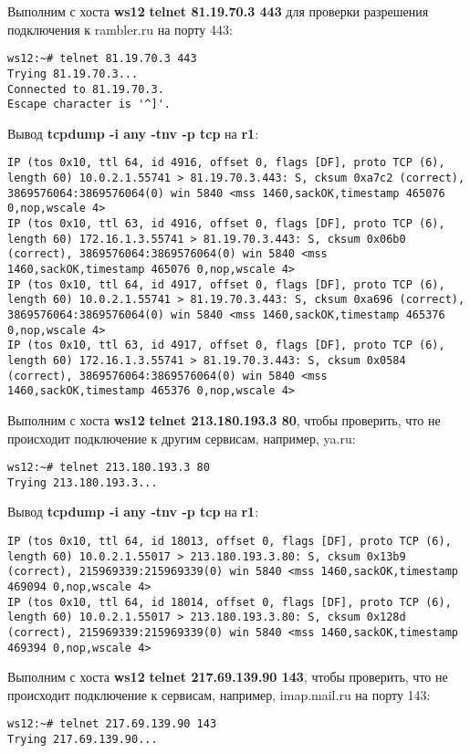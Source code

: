 \documentclass[a4paper,12pt]{article}
\begin{document}
Выполним с хоста \textbf{ws12} \textbf{telnet 81.19.70.3 443} для проверки разрешения
подключения к rambler.ru на порту 443:
\begin{Verbatim}
ws12:~# telnet 81.19.70.3 443
Trying 81.19.70.3...
Connected to 81.19.70.3.
Escape character is '^]'.
\end{Verbatim}

Вывод \textbf{tcpdump -i any -tnv -p tcp} на \textbf{r1}:
\begin{Verbatim}
IP (tos 0x10, ttl 64, id 4916, offset 0, flags [DF], proto TCP (6), length 60) 10.0.2.1.55741 > 81.19.70.3.443: S, cksum 0xa7c2 (correct), 3869576064:3869576064(0) win 5840 <mss 1460,sackOK,timestamp 465076 0,nop,wscale 4>
IP (tos 0x10, ttl 63, id 4916, offset 0, flags [DF], proto TCP (6), length 60) 172.16.1.3.55741 > 81.19.70.3.443: S, cksum 0x06b0 (correct), 3869576064:3869576064(0) win 5840 <mss 1460,sackOK,timestamp 465076 0,nop,wscale 4>
IP (tos 0x10, ttl 64, id 4917, offset 0, flags [DF], proto TCP (6), length 60) 10.0.2.1.55741 > 81.19.70.3.443: S, cksum 0xa696 (correct), 3869576064:3869576064(0) win 5840 <mss 1460,sackOK,timestamp 465376 0,nop,wscale 4>
IP (tos 0x10, ttl 63, id 4917, offset 0, flags [DF], proto TCP (6), length 60) 172.16.1.3.55741 > 81.19.70.3.443: S, cksum 0x0584 (correct), 3869576064:3869576064(0) win 5840 <mss 1460,sackOK,timestamp 465376 0,nop,wscale 4>
\end{Verbatim}

Выполним с хоста \textbf{ws12} \textbf{telnet 213.180.193.3 80},  чтобы проверить, что
не происходит подключение к другим сервисам, например, ya.ru:
\begin{Verbatim}
ws12:~# telnet 213.180.193.3 80
Trying 213.180.193.3...
\end{Verbatim}

Вывод \textbf{tcpdump -i any -tnv -p tcp} на \textbf{r1}:
\begin{Verbatim}
IP (tos 0x10, ttl 64, id 18013, offset 0, flags [DF], proto TCP (6), length 60) 10.0.2.1.55017 > 213.180.193.3.80: S, cksum 0x13b9 (correct), 215969339:215969339(0) win 5840 <mss 1460,sackOK,timestamp 469094 0,nop,wscale 4>
IP (tos 0x10, ttl 64, id 18014, offset 0, flags [DF], proto TCP (6), length 60) 10.0.2.1.55017 > 213.180.193.3.80: S, cksum 0x128d (correct), 215969339:215969339(0) win 5840 <mss 1460,sackOK,timestamp 469394 0,nop,wscale 4>
\end{Verbatim}

Выполним с хоста \textbf{ws12} \textbf{telnet 217.69.139.90 143},  чтобы проверить,
что не происходит подключение к сервисам, например, imap.mail.ru на порту 143:
\begin{Verbatim}
ws12:~# telnet 217.69.139.90 143
Trying 217.69.139.90...
\end{Verbatim}
\end{document}
